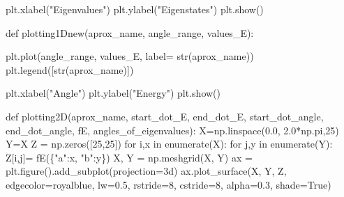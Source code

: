 \documentclass[
  letterpaper,
  DIV=11,
  numbers=noendperiod]{scrartcl}
\newenvironment{Shaded}{\begin{snugshade}}{\end{snugshade}}
\newcommand{\BuiltInTok}[1]{\textcolor[rgb]{0.00,0.23,0.31}{#1}}
\newcommand{\ControlFlowTok}[1]{\textcolor[rgb]{0.00,0.23,0.31}{#1}}
\newcommand{\DecValTok}[1]{\textcolor[rgb]{0.68,0.00,0.00}{#1}}
\newcommand{\FloatTok}[1]{\textcolor[rgb]{0.68,0.00,0.00}{#1}}
\newcommand{\KeywordTok}[1]{\textcolor[rgb]{0.00,0.23,0.31}{#1}}
\newcommand{\NormalTok}[1]{\textcolor[rgb]{0.00,0.23,0.31}{#1}}
\newcommand{\OperatorTok}[1]{\textcolor[rgb]{0.37,0.37,0.37}{#1}}
\newcommand{\StringTok}[1]{\textcolor[rgb]{0.13,0.47,0.30}{#1}}
\newcommand{\VariableTok}[1]{\textcolor[rgb]{0.07,0.07,0.07}{#1}}
\begin{document}
\begin{Shaded}
\begin{Highlighting}[]
\NormalTok{        plt.xlabel(}\StringTok{"Eigenvalues"}\NormalTok{)}
\NormalTok{        plt.ylabel(}\StringTok{"Eigenstates"}\NormalTok{)}
\NormalTok{        plt.show()}

    \KeywordTok{def}\NormalTok{ plotting1Dnew(aprox\_name, angle\_range, values\_E):}
        
\NormalTok{        plt.plot(angle\_range, values\_E, label}\OperatorTok{=} \BuiltInTok{str}\NormalTok{(aprox\_name))}
\NormalTok{        plt.legend([}\BuiltInTok{str}\NormalTok{(aprox\_name)])}
        
\NormalTok{        plt.xlabel(}\StringTok{"Angle"}\NormalTok{)}
\NormalTok{        plt.ylabel(}\StringTok{"Energy"}\NormalTok{)}
\NormalTok{        plt.show()}

    \KeywordTok{def}\NormalTok{ plotting2D(aprox\_name, start\_dot\_E, end\_dot\_E, start\_dot\_angle, end\_dot\_angle, fE, angles\_of\_eigenvalues):}
\NormalTok{        X}\OperatorTok{=}\NormalTok{np.linspace(}\FloatTok{0.0}\NormalTok{, }\FloatTok{2.0}\OperatorTok{*}\NormalTok{np.pi,}\DecValTok{25}\NormalTok{)}
\NormalTok{        Y}\OperatorTok{=}\NormalTok{X}
\NormalTok{        Z }\OperatorTok{=}\NormalTok{ np.zeros([}\DecValTok{25}\NormalTok{,}\DecValTok{25}\NormalTok{])}
        \ControlFlowTok{for}\NormalTok{ i,x }\KeywordTok{in} \BuiltInTok{enumerate}\NormalTok{(X):}
            \ControlFlowTok{for}\NormalTok{ j,y }\KeywordTok{in} \BuiltInTok{enumerate}\NormalTok{(Y):}
\NormalTok{                Z[i,j]}\OperatorTok{=}\NormalTok{ fE(\{}\StringTok{"a"}\NormalTok{:x, }\StringTok{"b"}\NormalTok{:y\})}
\NormalTok{        X, Y }\OperatorTok{=}\NormalTok{ np.meshgrid(X, Y)}
\NormalTok{        ax }\OperatorTok{=}\NormalTok{ plt.figure().add\_subplot(projection}\OperatorTok{=}\StringTok{\textquotesingle{}3d\textquotesingle{}}\NormalTok{)}
\NormalTok{        ax.plot\_surface(X, Y, Z, edgecolor}\OperatorTok{=}\StringTok{\textquotesingle{}royalblue\textquotesingle{}}\NormalTok{, lw}\OperatorTok{=}\FloatTok{0.5}\NormalTok{, rstride}\OperatorTok{=}\DecValTok{8}\NormalTok{, cstride}\OperatorTok{=}\DecValTok{8}\NormalTok{,}
\NormalTok{                        alpha}\OperatorTok{=}\FloatTok{0.3}\NormalTok{, shade}\OperatorTok{=}\VariableTok{True}\NormalTok{)}
        

\end{Highlighting}
\end{Shaded}
\end{document}

